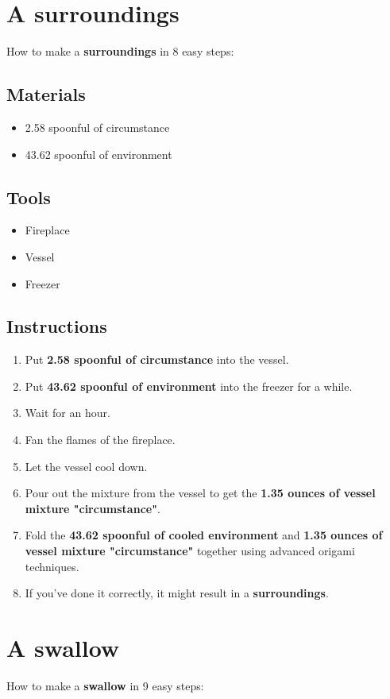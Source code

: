 \documentclass{article}
\begin{document}
\section{A surroundings}How to make a \textbf{surroundings} in 8 easy steps:

\subsection{Materials}\begin{itemize}
\item 
2.58 spoonful of circumstance
\item 
43.62 spoonful of environment
\end{itemize}
\subsection{Tools}\begin{itemize}
\item 
Fireplace
\item 
Vessel
\item 
Freezer
\end{itemize}
\subsection{Instructions}\begin{enumerate}
\item 
Put \textbf{2.58 spoonful of circumstance} into the vessel.
\item 
Put \textbf{43.62 spoonful of environment} into the freezer for a while.
\item 
Wait for an hour.
\item 
Fan the flames of the fireplace.
\item 
Let the vessel cool down.
\item 
Pour out the mixture from the vessel to get the \textbf{1.35 ounces of vessel mixture "circumstance"}.
\item 
Fold the \textbf{43.62 spoonful of cooled environment} and \textbf{1.35 ounces of vessel mixture "circumstance"} together using advanced origami techniques.
\item 
If you've done it correctly, it might result in a \textbf{surroundings}.
\end{enumerate}
\newpage
\section{A swallow}How to make a \textbf{swallow} in 9 easy steps:
\end{document}
